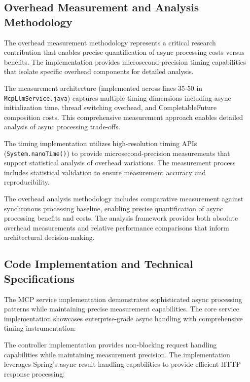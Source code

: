 \subsection{Overhead Measurement and Analysis Methodology}

The overhead measurement methodology represents a critical research contribution that enables precise quantification of async processing costs versus benefits. The implementation provides microsecond-precision timing capabilities that isolate specific overhead components for detailed analysis.

The measurement architecture (implemented across lines 35-50 in \texttt{McpLlmService.java}) captures multiple timing dimensions including async initialization time, thread switching overhead, and CompletableFuture composition costs. This comprehensive measurement approach enables detailed analysis of async processing trade-offs.


The timing implementation utilizes high-resolution timing APIs (\texttt{System.nanoTime()}) to provide microsecond-precision measurements that support statistical analysis of overhead variations. The measurement process includes statistical validation to ensure measurement accuracy and reproducibility.

The overhead analysis methodology includes comparative measurement against synchronous processing baseline, enabling precise quantification of async processing benefits and costs. The analysis framework provides both absolute overhead measurements and relative performance comparisons that inform architectural decision-making.

\subsection{Code Implementation and Technical Specifications}

The MCP service implementation demonstrates sophisticated async processing patterns while maintaining precise measurement capabilities. The core service implementation showcases enterprise-grade async handling with comprehensive timing instrumentation:



The controller implementation provides non-blocking request handling capabilities while maintaining measurement precision. The implementation leverages Spring's async result handling capabilities to provide efficient HTTP response processing:

